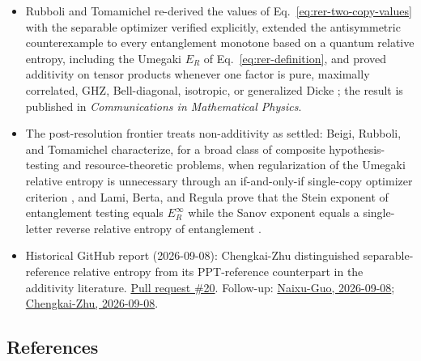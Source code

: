 \begin{itemize}
  \item Rubboli and Tomamichel re-derived the values of
Eq.~\eqref{eq:rer-two-copy-values} with the separable optimizer verified
explicitly, extended the antisymmetric counterexample to every entanglement
monotone based on a quantum relative entropy, including the Umegaki $E_R$ of
Eq.~\eqref{eq:rer-definition}, and proved additivity on tensor products
whenever one factor is pure, maximally correlated, GHZ, Bell-diagonal,
isotropic, or generalized Dicke
; the result is published in
\emph{Communications in Mathematical Physics}.

  \item The post-resolution frontier treats non-additivity as settled: Beigi,
Rubboli, and Tomamichel characterize, for a broad class of composite
hypothesis-testing and resource-theoretic problems, when regularization of
the Umegaki relative entropy is unnecessary through an if-and-only-if
single-copy optimizer criterion , and Lami,
Berta, and Regula prove that the Stein exponent of entanglement testing
equals $E_R^\infty$ while the Sanov exponent equals a single-letter reverse
relative entropy of entanglement .

  \item Historical GitHub report (2026-09-08): Chengkai-Zhu distinguished separable-reference relative entropy from its PPT-reference counterpart in the additivity literature. \href{https://github.com/Naixu-Guo/quantum-open-problems/pull/20}{Pull request \#20}. Follow-up: \href{https://github.com/Naixu-Guo/quantum-open-problems/pull/20#issuecomment-5585707428}{Naixu-Guo, 2026-09-08}; \href{https://github.com/Naixu-Guo/quantum-open-problems/pull/20#issuecomment-5587820346}{Chengkai-Zhu, 2026-09-08}.
\end{itemize}

\subsection*{References}

